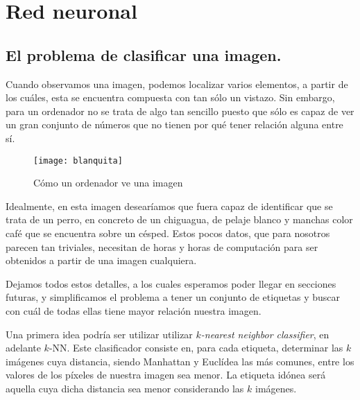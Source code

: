 
\chapter{Red neuronal}
\section{El problema de clasificar una imagen.}

Cuando observamos una imagen, podemos localizar varios elementos, a partir de los cuáles, esta se encuentra compuesta con tan sólo un vistazo. Sin embargo, para un ordenador no se trata de algo tan sencillo puesto que sólo es capaz de ver un gran conjunto de números que no tienen por qué tener relación alguna entre sí.\newline

\begin{figure}[htpb]
  \centering
  \texttt{[image: blanquita]}
  \caption{Cómo un ordenador ve una imagen}
  \label{fig:blanquita}
\end{figure}

Idealmente, en esta imagen desearíamos que fuera capaz de identificar que se trata de un perro, en concreto de un chiguagua, de pelaje blanco y manchas color café que se encuentra sobre un césped. Estos pocos datos, que para nosotros parecen tan triviales, necesitan de horas y horas de computación para ser obtenidos a partir de una imagen cualquiera.\newline

Dejamos todos estos detalles, a los cuales esperamos poder llegar en secciones futuras, y simplificamos el problema a tener un conjunto de etiquetas y buscar con cuál de todas ellas tiene mayor relación nuestra imagen.\newline

Una primera idea podría ser utilizar utilizar \emph{$k$-nearest neighbor classifier}, en adelante $k$-NN. Este clasificador consiste en, para cada etiqueta, determinar las $k$ imágenes cuya distancia, siendo Manhattan y Euclídea las más comunes, entre los valores de los píxeles de nuestra imagen sea menor. La etiqueta idónea será aquella cuya dicha distancia sea menor considerando las $k$ imágenes.\\


